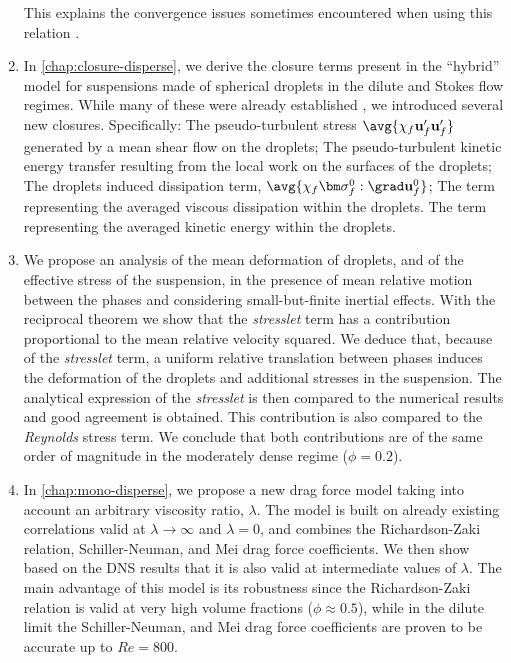 \begin{enumerate}
    This explains the convergence issues sometimes encountered when using this relation \citep{batchelor1972sedimentation}. 
    \item In \ref{chap:closure-disperse}, we derive the closure terms present in the ``hybrid'' model for suspensions made of spherical droplets in the dilute and Stokes flow regimes. 
    While many of these were already established \citep[Appendix A]{zhang1997momentum}, we introduced several new closures.
    Specifically: 
    The pseudo-turbulent stress $\avg{\chi_f \textbf{u}_f'\textbf{u}_f'}$ generated by a mean shear flow on the droplets; 
    The pseudo-turbulent kinetic energy transfer resulting from the local work on the surfaces of the droplets; 
    The droplets induced dissipation term, $\avg{\chi_f \bm\sigma_f^0:\grad \textbf{u}_f^0}$; 
    The term representing the averaged viscous dissipation within the droplets. 
    The term representing the averaged kinetic energy within the droplets. 
    \item We propose an analysis of the mean deformation of droplets, and of the effective stress of the suspension, in the presence of mean relative motion between the phases and considering small-but-finite inertial effects. 
    With the reciprocal theorem we show that the \textit{stresslet} term has a contribution proportional to the mean relative velocity squared. 
    We deduce that, because of the \textit{stresslet} term, a uniform relative translation between phases induces the deformation of the droplets and additional stresses in the suspension. 
    The analytical expression of the \textit{stresslet} is then compared to the numerical results and good agreement is obtained. 
    This contribution is also compared to the \textit{Reynolds} stress term. 
    We conclude that both contributions are of the same order of magnitude in the moderately dense regime ($\phi =0.2$). 
    \item In \ref{chap:mono-disperse}, we propose a new drag force model taking into account an arbitrary viscosity ratio, $\lambda$. 
    The model is built on already existing correlations valid at $\lambda\to\infty$ and $\lambda = 0$, and combines the Richardson-Zaki relation, Schiller-Neuman, and Mei drag force coefficients.
    We then show based on the DNS results that it is also valid at intermediate values of $\lambda$.
    The main advantage of this model is its robustness since the Richardson-Zaki relation is valid at very high volume fractions  ($\phi \approx 0.5$), while in the dilute limit the Schiller-Neuman, and Mei drag force coefficients are proven to be accurate up to $Re = 800$. 

\end{enumerate}
